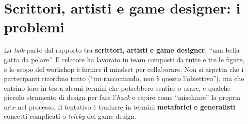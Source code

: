 \section{Scrittori, artisti e game designer: i problemi}
\label{sec:z6-problemi}

La \emph{talk} parte dal rapporto tra \textbf{scrittori, artisti e game
designer}: ``una bella gatta da pelare''. Il relatore ha lavorato in team
composti da tutte e tre le figure, e lo scopo del workshop è fornire il
mindset per collaborare. Non si aspetta che i partecipanti ricordino tutto
(``mi raccomando, non è questo l'obiettivo''), ma che entrino loro in testa
alcuni termini che potrebbero sentire o usare, e qualche piccolo strumento di
design per fare l'\emph{hack} e capire come ``mischiare'' la propria arte nel
processo. Il tentativo è tradurre in termini \textbf{metaforici e generalisti}
concetti complicati o \emph{tricky} del game design.

